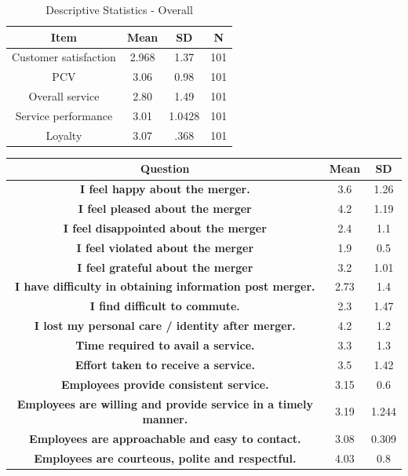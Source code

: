 \documentclass[a4paper, 14pt]{article}
\begin{document}
{\begin{table}[H]
\centering
\begin{tabular}{|c|c|c|c|}
\hline
Item & \textbf{Mean} & \textbf{SD} & N \\
\hline
Customer satisfaction & 2.968 & 1.37 & 101 \\
\hline
PCV & 3.06 & 0.98 & 101 \\
\hline
Overall service & 2.80 & 1.49 & 101 \\
\hline
Service performance & 3.01 & 1.0428 & 101 \\
\hline
Loyalty & 3.07 & .368 & 101 \\
\hline
\end{tabular}
\caption{Descriptive Statistics - Overall}
\end{table} 

\begin{table}[H]
\centering
\begin{tabular}{|c|c|c|}
\hline
Question & Mean & SD \\
\hline
\textbf{ I feel happy about the merger.} & 3.6 & 1.26 \\
\hline
\textbf{ I feel pleased about the merger} & 4.2 & 1.19 \\
\hline
\textbf{ I feel disappointed about the merger } & 2.4 & 1.1 \\
\hline
\textbf{ I feel violated about the merger} & 1.9 & 0.5 \\
\hline
\textbf{ I feel grateful about the merger} & 3.2 & 1.01 \\
\hline
\textbf{ I have difficulty in obtaining information post merger. } & 2.73 & 1.4 \\
\hline
\textbf{ I find difficult to commute.} & 2.3 & 1.47 \\
\hline    
\textbf{ I lost my personal care / identity after merger. } & 4.2 & 1.2 \\
\hline
\textbf{ Time required to avail a service.} & 3.3 & 1.3 \\
\hline
\textbf{ Effort taken to receive a service.}  & 3.5 & 1.42 \\ 
\hline
\textbf{ Employees provide consistent service.}  & 3.15 & 0.6\\  
\hline
\textbf{ Employees are willing and provide service in a timely manner.} & 3.19 & 1.244\\
\hline
\textbf{ Employees are approachable and easy to contact.} & 3.08 & 0.309\\   
\hline
\textbf{ Employees are courteous, polite and respectful.} & 4.03 & 0.8 \\

\end{tabular}
\end{table}}
\end{document}
